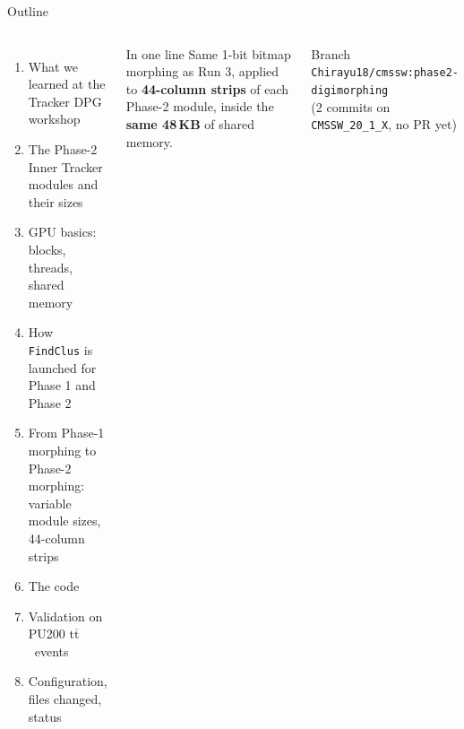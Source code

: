 \documentclass[aspectratio=169,10pt,xcolor=table]{beamer}
\newcommand{\ttbar}{\ensuremath{\mathrm{t}\overline{\mathrm{t}}}}
\newcommand{\code}[1]{\texttt{\small #1}}
\begin{document}
\begin{frame}{Outline}
  \begin{columns}[T]
    \begin{enumerate}
      \item What we learned at the Tracker DPG workshop
      \item The Phase-2 Inner Tracker modules and their sizes
      \item GPU basics: blocks, threads, shared memory
      \item How \code{FindClus} is launched for Phase 1 and Phase 2
      \item From Phase-1 morphing to Phase-2 morphing:\\ variable module sizes, 44-column strips
      \item The code
      \item Validation on PU200 \ttbar\ events
      \item Configuration, files changed, status
    \end{enumerate}
    \begin{block}{In one line}
      Same 1-bit bitmap morphing as Run 3, applied to \textbf{44-column strips} of each Phase-2 module,
      inside the \textbf{same 48\,KB} of shared memory.
    \end{block}
    \vspace{4pt}
    \small Branch \code{Chirayu18/cmssw:phase2-digimorphing}\\
    (2 commits on \code{CMSSW\_20\_1\_X}, no PR yet)
  \end{columns}
\end{frame}

\end{document}
